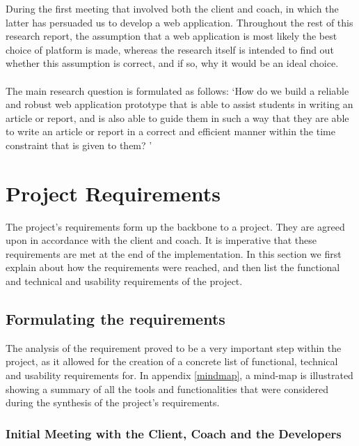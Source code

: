 During the first meeting that involved both the client and coach, in which the latter has persuaded us to develop a web application. Throughout the rest of this research report, the assumption that a web application is most likely the best choice of platform is made, whereas the research itself is intended to find out whether this assumption is correct, and if so, why it would be an ideal choice. \\\\

The main research question is formulated as follows: `How do we build a reliable and robust web application prototype that is able to assist students in writing an article or report, and is also able to guide them in such a way that they are able to write an article or report in a correct and efficient manner within the time constraint that is given to them? '

\section{Project Requirements}
\label{req}

The project's requirements form up the backbone to a project. They are agreed upon in accordance with the client and coach. It is imperative that these requirements are met at the end of the implementation. In this section we first explain about how the requirements were reached, and then list the functional and technical and usability requirements of the project.

\subsection{Formulating the requirements} %
\label{sub:subsection_name}
The analysis of the requirement proved to be a very important step within the project, as it allowed for the creation of a concrete list of functional, technical and usability requirements for. In appendix \ref{mindmap}, a mind-map is illustrated showing a summary of all the tools and functionalities that were considered during the synthesis of the project's requirements.


\subsubsection{Initial Meeting with the Client, Coach and the Developers} %
\label{sub:meeting_client_coach_developer_team_meeting_}

